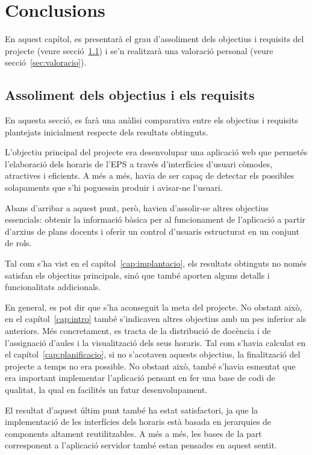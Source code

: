 \documentclass[a4paper,12pt]{ThesisStyle}
\begin{document}
\chapter{Conclusions}
\label{cap:conclusions}

En aquest capítol, es presentarà el grau d'assoliment dels objectius i requisits del projecte (veure secció~\ref{sec:assoliment_objectius}) i se'n realitzarà una valoració personal (veure secció~\ref{sec:valoracio}).

\section{Assoliment dels objectius i els requisits}
\label{sec:assoliment_objectius}

En aquesta secció, es farà una anàlisi comparativa entre els objectius i requisits plantejats inicialment respecte dels resultats obtinguts.

L'objectiu principal del projecte era desenvolupar una aplicació web que permetés l'elaboració dels horaris de l'EPS a través d'interfícies d'usuari còmodes, atractives i eficients. A més a més, havia de ser capaç de detectar els possibles solapaments que s'hi poguessin produir i avisar-ne l'usuari.

Abans d'arribar a aquest punt, però, havien d'assolir-se altres objectius essencials: obtenir la informació bàsica per al funcionament de l'aplicació a partir d'arxius de plans docents i oferir un control d'usuaris estructurat en un conjunt de rols.

Tal com s'ha vist en el capítol~\ref{cap:implantacio}, els resultats obtinguts no només satisfan els objectius principals, sinó que també aporten alguns detalls i funcionalitats addicionals.

En general, es pot dir que s'ha aconseguit la meta del projecte. No obstant això, en el capítol~\ref{cap:intro} també s'indicaven altres objectius amb un pes inferior als anteriors. Més concretament, es tracta de la distribució de docència i de l'assignació d'aules i la visualització dels seus horaris. Tal com s'havia calculat en el capítol~\ref{cap:planificacio}, si no s'acotaven aquests objectius, la finalització del projecte a temps no era possible. No obstant això, també s'havia esmentat que era important implementar l'aplicació pensant en fer una base de codi de qualitat, la qual en facilités un futur desenvolupament.

El resultat d'aquest últim punt també ha estat satisfactori, ja que la implementació de les interfícies dels horaris està basada en jerarquies de components altament reutilitzables. A més a més, les bases de la part corresponent a l'aplicació servidor també estan pensades en aquest sentit.
\end{document}
